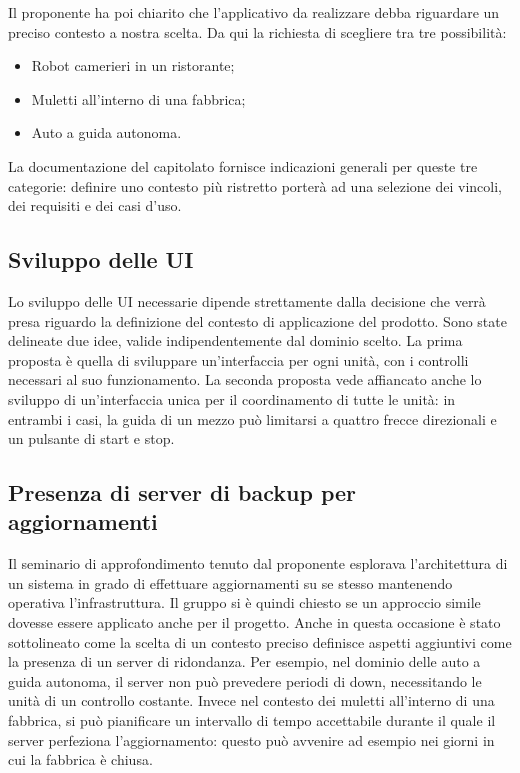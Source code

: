 Il proponente ha poi chiarito che l'applicativo da realizzare debba riguardare un preciso contesto a nostra scelta. Da qui la richiesta di scegliere tra tre possibilità:
\begin{itemize}
	\item Robot camerieri in un ristorante;
	\item Muletti all'interno di una fabbrica;
	\item Auto a guida autonoma.
\end{itemize}
La documentazione del capitolato fornisce indicazioni generali per queste tre categorie: definire uno contesto più ristretto porterà ad una selezione dei vincoli, dei requisiti e dei casi d'uso.


\subsection{Sviluppo delle UI} 

Lo sviluppo delle UI necessarie dipende strettamente dalla decisione che verrà presa riguardo la definizione del contesto di applicazione del prodotto. Sono state delineate due idee, valide indipendentemente dal dominio scelto.
La prima proposta è quella di sviluppare un'interfaccia per ogni unità, con i controlli necessari al suo funzionamento.
La seconda proposta vede affiancato anche lo sviluppo di un'interfaccia unica per il coordinamento di tutte le unità: in entrambi i casi, la guida di un mezzo può limitarsi a quattro frecce direzionali e un pulsante di start e stop. 

 
\subsection{Presenza di server di backup per aggiornamenti}

Il seminario di approfondimento tenuto dal proponente esplorava l'architettura di un sistema in grado di effettuare aggiornamenti su se stesso mantenendo operativa l'infrastruttura. Il gruppo si è quindi chiesto se un approccio simile dovesse essere applicato anche per il progetto.
Anche in questa occasione è stato sottolineato come la scelta di un contesto preciso definisce aspetti aggiuntivi come la presenza di un server di ridondanza. 
Per esempio, nel dominio delle auto a guida autonoma, il server non può prevedere periodi di down, necessitando le unità di un controllo costante. Invece nel contesto dei muletti all'interno di una fabbrica, si può pianificare un intervallo di tempo accettabile durante il quale il server perfeziona l'aggiornamento: questo può avvenire ad esempio nei giorni in cui la fabbrica è chiusa. 

